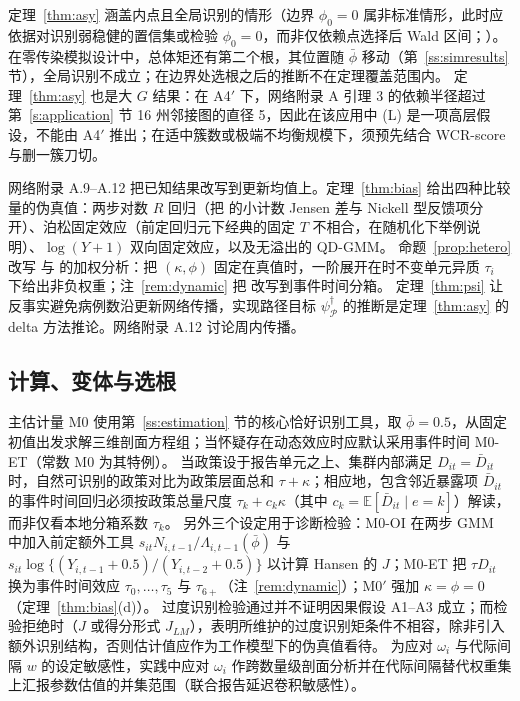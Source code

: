 \documentclass[11pt,a4paper]{ctexart}
\theoremstyle{definition}
\newcommand{\E}{\mathbb{E}}
\begin{document}
定理~\ref{thm:asy} 涵盖内点且全局识别的情形（边界 $\phi_0=0$ 属非标准情形，此时应依据对识别弱稳健的置信集或检验 $\phi_0=0$，而非仅依赖点选择后 Wald 区间；\citealp{stock2000weak,andrews2012identification,andrews2017subvector,cox2026simple}）。在零传染模拟设计中，总体矩还有第二个根，其位置随 $\bar\phi$ 移动（第~\ref{ss:simresults} 节），全局识别不成立；在边界处选根之后的推断不在定理覆盖范围内。
定理~\ref{thm:asy} 也是大 $G$ 结果：在 A4$'$ 下，网络附录 A 引理 3 的依赖半径超过第~\ref{s:application} 节 16 州邻接图的直径 5，因此在该应用中 (L) 是一项高层假设，不能由 A4$'$ 推出；在适中簇数或极端不均衡规模下，须预先结合 WCR-score 与删一簇刀切。

网络附录 A.9--A.12 把已知结果改写到更新均值上。定理~\ref{thm:bias} 给出四种比较量的伪真值：两步对数 $R$ 回归（把\citet{feng2024parallel} 的小计数 Jensen 差与 Nickell 型反馈项分开）、泊松固定效应（前定回归元下经典的固定 $T$ 不相合\citep{wooldridge1997multiplicative,blundell2002count}，在随机化下举例说明）、$\log(Y+1)$ 双向固定效应，以及无溢出的 QD-GMM。
命题~\ref{prop:hetero} 改写\citet{goodmanbacon2021did} 与\citet{dechaisemartin2020twfe} 的加权分析：把 $(\kappa,\phi)$ 固定在真值时，一阶展开在时不变单元异质 $\tau_i$ 下给出非负权重；注~\ref{rem:dynamic} 把\citet{sun2021estimating} 改写到事件时间分箱。
定理~\ref{thm:psi} 让反事实避免病例数沿更新网络传播，实现路径目标 $\psi^\dagger_{\mathcal P}$ 的推断是定理~\ref{thm:asy} 的 delta 方法推论。网络附录 A.12 讨论周内传播。

\subsection{计算、变体与选根}
\label{ss:computation}

主估计量 M0 使用第~\ref{ss:estimation} 节的核心恰好识别工具，取 $\bar\phi=0.5$，从固定初值出发求解三维剖面方程组；当怀疑存在动态效应时应默认采用事件时间 M0-ET（常数 M0 为其特例）。
当政策设于报告单元之上、集群内部满足 $D_{it}=\bar D_{it}$ 时，自然可识别的政策对比为政策层面总和 $\tau+\kappa$；相应地，包含邻近暴露项 $\bar D_{it}$ 的事件时间回归必须按政策总量尺度 $\tau_k+c_k\kappa$（其中 $c_k=\E[\bar D_{it}\mid e=k]$）解读，而非仅看本地分箱系数 $\tau_k$。
另外三个设定用于诊断检验：M0-OI 在两步 GMM 中加入前定额外工具 $s_{it}N_{i,t-1}/\Lambda_{i,t-1}(\bar\phi)$ 与 $s_{it}\log\{(Y_{i,t-1}+0.5)/(Y_{i,t-2}+0.5)\}$ 以计算 Hansen 的 $J$；M0-ET 把 $\tau D_{it}$ 换为事件时间效应 $\tau_0,\dots,\tau_5$ 与 $\tau_{6+}$（注~\ref{rem:dynamic}）；M0$'$ 强加 $\kappa=\phi=0$（定理~\ref{thm:bias}(d)）。
过度识别检验通过并不证明因果假设 A1--A3 成立；而检验拒绝时（$J$ 或得分形式 $J_{LM}$），表明所维护的过度识别矩条件不相容，除非引入额外识别结构，否则估计值应作为工作模型下的伪真值看待。
为应对 $\omega_i$ 与代际间隔 $w$ 的设定敏感性，实践中应对 $\omega_i$ 作跨数量级剖面分析并在代际间隔替代权重集上汇报参数估值的并集范围（联合报告延迟卷积敏感性）。
\end{document}
